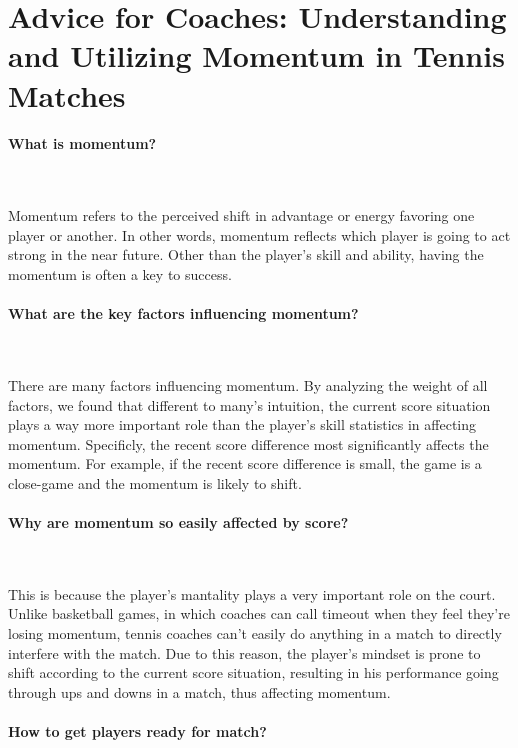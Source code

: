 \section{Advice for Coaches: Understanding and Utilizing Momentum in Tennis Matches}

\paragraph{What is momentum?}~{}

Momentum refers to the perceived shift in advantage or energy favoring one player or another. In other words, momentum reflects which player is going to act strong in the near future. Other than the player's skill and ability, having the momentum is often a key to success.

\paragraph{What are the key factors influencing momentum?}~{}

There are many factors influencing momentum. By analyzing the weight of all factors, we found that different to many's intuition, the current score situation plays a way more important role than the player's skill statistics in affecting momentum. Specificly, the recent score difference most significantly affects the momentum. For example, if the recent score difference is small, the game is a close-game and the momentum is likely to shift.

\paragraph{Why are momentum so easily affected by score?}~{}

This is because the player's mantality plays a very important role on the court. Unlike basketball games, in which coaches can call timeout when they feel they're losing momentum, tennis coaches can't easily do anything in a match to directly interfere with the match. Due to this reason, the player's mindset is prone to shift according to the current score situation, resulting in his performance going through ups and downs in a match, thus affecting momentum.

\paragraph{How to get players ready for match?}~{}

